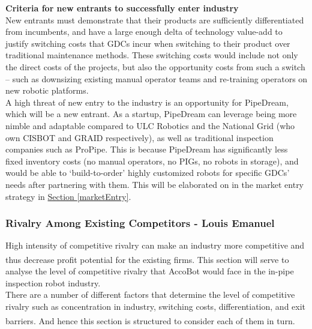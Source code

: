 \documentclass[11pt]{article}		%
\newcommand{\supercite}[1]{\textsuperscript{\cite{#1}}}		%
\newcommand{\sectref}[1]{\hyperref[#1]{Section \ref*{#1}}}     %
\begin{document}
            \textbf{Criteria for new entrants to successfully enter industry}
            \\
            New entrants must demonstrate that their products are sufficiently differentiated from incumbents, and have a large enough delta of technology value-add to justify switching costs that GDCs incur when switching to their product over traditional maintenance methods. These switching costs would include not only the direct costs of the projects, but also the opportunity costs from such a switch – such as downsizing existing manual operator teams and re-training operators on new robotic platforms. 
            \\
            \hspace*{2ex}A high threat of new entry to the industry is an opportunity for PipeDream, which will be a new entrant. As a startup, PipeDream can leverage being more nimble and adaptable compared to ULC Robotics and the National Grid (who own CISBOT and GRAID respectively), as well as traditional inspection companies such as ProPipe. This is because PipeDream has significantly less fixed inventory costs (no manual operators, no PIGs, no robots in storage), and would be able to ‘build-to-order’ highly customized robots for specific GDCs’ needs after partnering with them. This will be elaborated on in the market entry strategy in \sectref{marketEntry}. 
            
            \subsubsection{Rivalry Among Existing Competitors - Louis Emanuel}
		        
		        High intensity of competitive rivalry can make an industry more competitive and thus decrease profit potential for the existing firms\supercite{porter2008five}. This section will serve to analyse the level of competitive rivalry that AccoBot would face in the in-pipe inspection robot industry.
		        \\
                \hspace*{2ex}There are a number of different factors that determine the level of competitive rivalry such as concentration in industry, switching costs, differentiation, and exit barriers\supercite{rivalryfactorsCI}. And hence this section is structured to consider each of them in turn. 
		        
\end{document}
